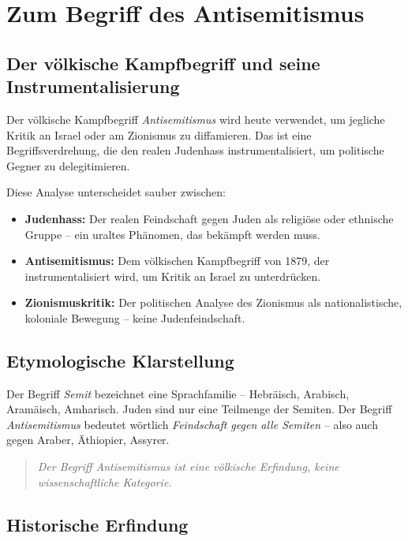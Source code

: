 \section{Zum Begriff des Antisemitismus}

\subsection{Der völkische Kampfbegriff und seine Instrumentalisierung}

Der völkische Kampfbegriff \emph{Antisemitismus} wird heute verwendet, um jegliche Kritik an Israel oder am Zionismus zu diffamieren. Das ist eine Begriffsverdrehung, die den realen Judenhass instrumentalisiert, um politische Gegner zu delegitimieren.

Diese Analyse unterscheidet sauber zwischen:

\begin{itemize}
    \item \textbf{Judenhass:} Der realen Feindschaft gegen Juden als religiöse oder ethnische Gruppe – ein uraltes Phänomen, das bekämpft werden muss.
    \item \textbf{Antisemitismus:} Dem völkischen Kampfbegriff von 1879, der instrumentalisiert wird, um Kritik an Israel zu unterdrücken.
    \item \textbf{Zionismuskritik:} Der politischen Analyse des Zionismus als nationalistische, koloniale Bewegung – keine Judenfeindschaft.
\end{itemize}

\subsection{Etymologische Klarstellung}

Der Begriff \emph{Semit} bezeichnet eine Sprachfamilie – Hebräisch, Arabisch, Aramäisch, Amharisch. Juden sind nur eine Teilmenge der Semiten. Der Begriff \emph{Antisemitismus} bedeutet wörtlich \emph{Feindschaft gegen alle Semiten} – also auch gegen Araber, Äthiopier, Assyrer.

\begin{quote}
\emph{Der Begriff Antisemitismus ist eine völkische Erfindung, keine wissenschaftliche Kategorie.}
\end{quote}

\subsection{Historische Erfindung}

